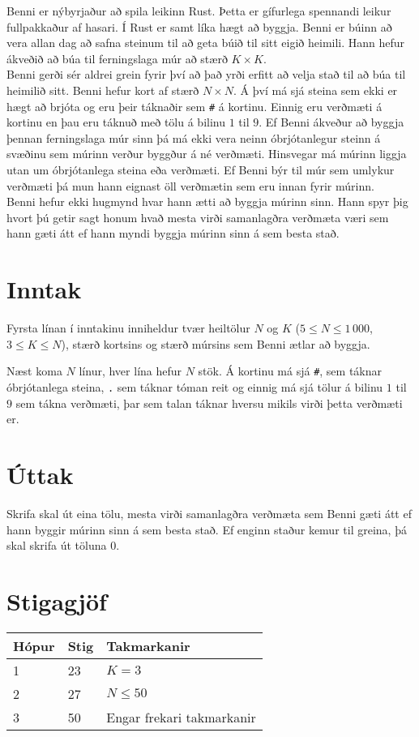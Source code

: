 
Benni er nýbyrjaður að spila leikinn Rust. Þetta er gífurlega spennandi leikur fullpakkaður
af hasari. Í Rust er samt líka hægt að byggja. Benni er búinn að vera allan dag að safna steinum
til að geta búið til sitt eigið heimili. Hann hefur ákveðið að búa til ferningslaga múr að stærð $K \times K$.  \\

Benni gerði sér aldrei grein fyrir því að það yrði erfitt að velja stað til að búa til heimilið sitt.
Benni hefur kort af stærð $N \times N$. Á því má sjá steina sem ekki er hægt að brjóta og eru þeir táknaðir
sem \texttt{\#} á kortinu. Einnig eru verðmæti á kortinu en þau eru táknuð með tölu á bilinu $1$ til $9$. Ef
Benni ákveður að byggja þennan ferningslaga múr sinn þá má ekki vera neinn óbrjótanlegur steinn á
svæðinu sem múrinn verður byggður á né verðmæti. Hinsvegar má múrinn liggja utan um óbrjótanlega steina eða verðmæti.
Ef Benni býr til múr sem umlykur verðmæti þá mun hann eignast öll verðmætin sem eru innan fyrir múrinn. \\

Benni hefur ekki hugmynd hvar hann ætti að byggja múrinn sinn. Hann spyr þig hvort þú
getir sagt honum hvað mesta virði samanlagðra verðmæta væri sem hann gæti átt ef hann myndi
byggja múrinn sinn á sem besta stað.

\section*{Inntak}
Fyrsta línan í inntakinu inniheldur tvær heiltölur $N$ og $K$ ($5 \leq N \leq 1\,000$, $3 \leq K \leq N$),
stærð kortsins og stærð múrsins sem Benni ætlar að byggja.

Næst koma $N$ línur, hver lína hefur $N$ stök. Á kortinu má sjá \texttt{\#}, sem
táknar óbrjótanlega steina, \texttt{.} sem táknar tóman reit og einnig má sjá
tölur á bilinu $1$ til $9$ sem tákna verðmæti, þar sem talan táknar hversu mikils virði
þetta verðmæti er.

\section*{Úttak}
Skrifa skal út eina tölu, mesta virði samanlagðra verðmæta sem Benni gæti átt
ef hann byggir múrinn sinn á sem besta stað. Ef enginn staður kemur til greina,
þá skal skrifa út töluna $0$.

\section*{Stigagjöf}
\begin{tabular}{|l|l|l|}
\hline
Hópur & Stig & Takmarkanir \\ \hline
1     & 23   & $K = 3$ \\ \hline
2     & 27   & $N \leq 50$ \\ \hline
3     & 50   & Engar frekari takmarkanir \\ \hline
\end{tabular}

